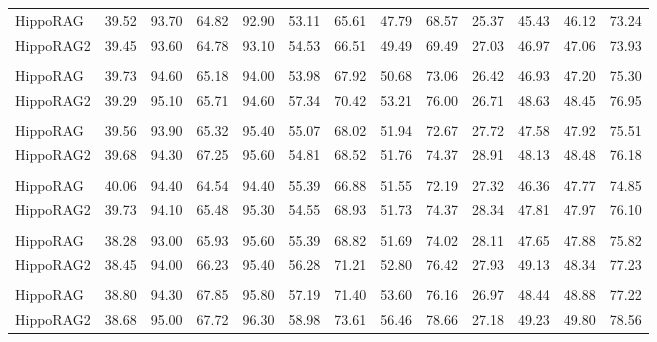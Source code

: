 \documentclass[11pt]{article}
\begin{document}
\begin{table}[!p]
{\begin{NiceTabular}{@{}l|cc|cc|cc|cc|cc|cc@{}}
 \\
\midrule
HippoRAG  & 39.52 & 93.70 & 64.82 & 92.90 & 53.11 & 65.61 & 47.79 & 68.57 & 25.37 & 45.43 & 46.12 & 73.24 \\
HippoRAG2 & 39.45 & 93.60 & 64.78 & 93.10 & 54.53 & 66.51 & 49.49 & 69.49 & 27.03 & 46.97 & 47.06 & 73.93 \\
\midrule

 \\
\midrule
HippoRAG  & 39.73 & 94.60 & 65.18 & 94.00 & 53.98 & 67.92 & 50.68 & 73.06 & 26.42 & 46.93 & 47.20 & 75.30 \\
HippoRAG2 & 39.29 & 95.10 & 65.71 & 94.60 & 57.34 & 70.42 & 53.21 & 76.00 & 26.71 & 48.63 & 48.45 & 76.95 \\
\midrule

 \\
\midrule
HippoRAG  & 39.56 & 93.90 & 65.32 & 95.40 & 55.07 & 68.02 & 51.94 & 72.67 & 27.72 & 47.58 & 47.92 & 75.51 \\
HippoRAG2 & 39.68 & 94.30 & 67.25 & 95.60 & 54.81 & 68.52 & 51.76 & 74.37 & 28.91 & 48.13 & 48.48 & 76.18 \\
\midrule

 \\
\midrule
HippoRAG  & 40.06 & 94.40 & 64.54 & 94.40 & 55.39 & 66.88 & 51.55 & 72.19 & 27.32 & 46.36 & 47.77 & 74.85 \\
HippoRAG2 & 39.73 & 94.10 & 65.48 & 95.30 & 54.55 & 68.93 & 51.73 & 74.37 & 28.34 & 47.81 & 47.97 & 76.10 \\
\midrule

 \\
\midrule
HippoRAG  & 38.28 & 93.00 & 65.93 & 95.60 & 55.39 & 68.82 & 51.69 & 74.02 & 28.11 & 47.65 & 47.88 & 75.82 \\
HippoRAG2 & 38.45 & 94.00 & 66.23 & 95.40 & 56.28 & 71.21 & 52.80 & 76.42 & 27.93 & 49.13 & 48.34 & 77.23 \\
\midrule

 \\
\midrule
HippoRAG  & 38.80 & 94.30 & 67.85 & 95.80 & 57.19 & 71.40 & 53.60 & 76.16 & 26.97 & 48.44 & 48.88 & 77.22 \\
HippoRAG2 & 38.68 & 95.00 & 67.72 & 96.30 & 58.98 & 73.61 & 56.46 & 78.66 & 27.18 & 49.23 & 49.80 & 78.56 \\
\bottomrule
\end{NiceTabular}}
\end{table}
\end{document}
